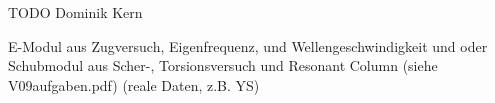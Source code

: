 TODO Dominik Kern

\bigskip

E-Modul aus Zugversuch, Eigenfrequenz, und Wellengeschwindigkeit 
und oder Schubmodul aus Scher-, Torsionsversuch und Resonant Column (siehe V09aufgaben.pdf)
(reale Daten, z.B. YS)



